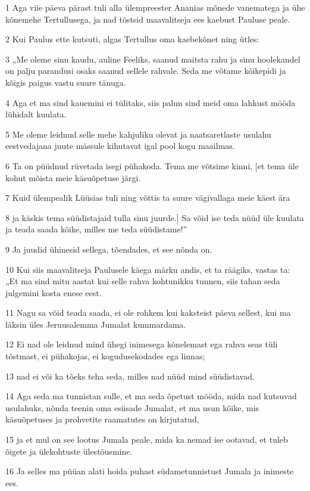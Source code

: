 \par 1 Aga viie päeva pärast tuli alla ülempreester Ananias mõnede vanematega ja ühe kõnemehe Tertullusega, ja nad tõstsid maavalitseja ees kaebust Pauluse peale.
\par 2 Kui Paulus ette kutsuti, algas Tertullus oma kaebekõnet ning ütles:
\par 3 „Me oleme sinu kaudu, auline Feeliks, saanud maitsta rahu ja sinu hoolekandel on palju parandusi osaks saanud sellele rahvale. Seda me võtame kõikepidi ja kõigis paigus vastu suure tänuga.
\par 4 Aga et ma sind kauemini ei tülitaks, siis palun sind meid oma lahkust mööda lühidalt kuulata.
\par 5 Me oleme leidnud selle mehe kahjuliku olevat ja naatsaretlaste usulahu eestvedajana juute mässule kihutavat igal pool kogu maailmas.
\par 6 Ta on püüdnud rüvetada isegi pühakoda. Tema me võtsime kinni, [et tema üle kohut mõista meie käsuõpetuse järgi.
\par 7 Kuid ülempealik Lüüsias tuli ning võttis ta suure vägivallaga meie käest ära
\par 8 ja käskis tema süüdistajaid tulla sinu juurde.] Sa võid ise teda nüüd üle kuulata ja teada saada kõike, milles me teda süüdistame!”
\par 9 Ja juudid ühinesid sellega, tõendades, et see nõnda on.
\par 10 Kui siis maavalitseja Paulusele käega märku andis, et ta räägiks, vastas ta: „Et ma sind mitu aastat kui selle rahva kohtunikku tunnen, siis tahan seda julgemini kosta enese eest.
\par 11 Nagu sa võid teada saada, ei ole rohkem kui kaksteist päeva sellest, kui ma läksin üles Jeruusalemma Jumalat kummardama.
\par 12 Ei nad ole leidnud mind ühegi inimesega kõnelemast ega rahva seas tüli tõstmast, ei pühakojas, ei kogudusekodades ega linnas;
\par 13 nad ei või ka tõeks teha seda, milles nad nüüd mind süüdistavad.
\par 14 Aga seda ma tunnistan sulle, et ma seda õpetust mööda, mida nad kutsuvad usulahuks, nõnda teenin oma esiisade Jumalat, et ma usun kõike, mis käsuõpetuses ja prohvetite raamatutes on kirjutatud,
\par 15 ja et mul on see lootus Jumala peale, mida ka nemad ise ootavad, et tuleb õigete ja ülekohtuste ülestõusmine.
\par 16 Ja selles ma püüan alati hoida puhast südametunnistust Jumala ja inimeste ees.
